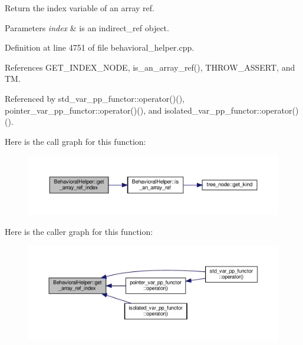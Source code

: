 Return the index variable of an array ref. 


\begin{DoxyParams}{Parameters}
{\em index} & is an indirect\+\_\+ref object. \\
\hline
\end{DoxyParams}


Definition at line 4751 of file behavioral\+\_\+helper.\+cpp.



References G\+E\+T\+\_\+\+I\+N\+D\+E\+X\+\_\+\+N\+O\+DE, is\+\_\+an\+\_\+array\+\_\+ref(), T\+H\+R\+O\+W\+\_\+\+A\+S\+S\+E\+RT, and TM.



Referenced by std\+\_\+var\+\_\+pp\+\_\+functor\+::operator()(), pointer\+\_\+var\+\_\+pp\+\_\+functor\+::operator()(), and isolated\+\_\+var\+\_\+pp\+\_\+functor\+::operator()().

Here is the call graph for this function\+:
\nopagebreak
\begin{figure}[H]
\begin{center}
\leavevmode
\includegraphics[width=350pt]{dd/db2/classBehavioralHelper_ae4927e97c38dcd00e2afabfd90290d3b_cgraph}
\end{center}
\end{figure}
Here is the caller graph for this function\+:
\nopagebreak
\begin{figure}[H]
\begin{center}
\leavevmode
\includegraphics[width=350pt]{dd/db2/classBehavioralHelper_ae4927e97c38dcd00e2afabfd90290d3b_icgraph}
\end{center}
\end{figure}
\mbox{\label{classBehavioralHelper_a29fb375c54f0dc9caa3559aff0ff1850}} 
